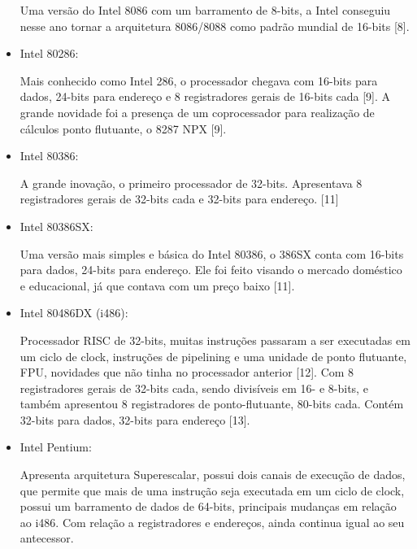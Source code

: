 \documentclass[12pt]{article}
\begin{document}
\begin{itemize}
		Uma versão do Intel 8086 com um barramento de 8-bits, a Intel conseguiu nesse ano tornar a arquitetura 8086/8088 como padrão mundial de 16-bits [8].
	\item Intel 80286: \
	
		Mais conhecido como Intel 286, o processador chegava com 16-bits para dados, 24-bits para endereço e 8 registradores gerais de 16-bits cada [9]. A grande novidade foi a presença de um coprocessador para realização de cálculos ponto flutuante, o 8287 NPX [9].
	\item Intel 80386: \
	
		A grande inovação, o primeiro processador de 32-bits. Apresentava 8 registradores gerais de 32-bits cada e 32-bits para endereço. [11]
	\item Intel 80386SX: \
	
		Uma versão mais simples e básica do Intel 80386, o 386SX conta com 16-bits para dados, 24-bits para endereço. Ele foi feito visando o mercado doméstico e educacional, já que contava com um preço baixo [11]. 
	\item Intel 80486DX (i486): \
	
		Processador RISC de 32-bits, muitas instruções passaram a ser executadas em um ciclo de clock, instruções de pipelining e uma unidade de ponto flutuante, FPU, novidades que não tinha no processador anterior [12]. Com 8 registradores gerais de 32-bits cada, sendo divisíveis em 16- e 8-bits, e também apresentou 8 registradores de ponto-flutuante, 80-bits cada. Contém 32-bits para dados, 32-bits para endereço [13].
	\item Intel Pentium: \
	
		Apresenta arquitetura Superescalar, possui dois canais de execução de dados, que permite que mais de uma instrução seja executada em um ciclo de clock, possui um barramento de dados de 64-bits, principais mudanças em relação ao i486. Com relação a registradores e endereços, ainda continua igual ao seu antecessor.
	\end{itemize}
\newpage
\end{document}
